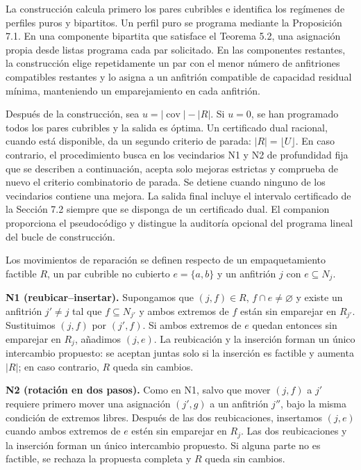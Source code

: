\documentclass[spanish,11pt,a4paper]{article}
\begin{document}
La construcción calcula primero los pares cubribles e identifica los
regímenes de perfiles puros y bipartitos. Un perfil puro se programa
mediante la Proposición 7.1. En una componente bipartita que satisface
el Teorema 5.2, una asignación propia desde listas programa cada par
solicitado. En las componentes restantes, la construcción elige
repetidamente un par con el menor número de anfitriones compatibles
restantes y lo asigna a un anfitrión compatible de capacidad residual
mínima, manteniendo un emparejamiento en cada anfitrión.

Después de la construcción, sea \(u=|\operatorname{cov}|-|R|\). Si
\(u=0\), se han programado todos los pares cubribles y la salida es
óptima. Un certificado dual racional, cuando está disponible, da un
segundo criterio de parada: \(|R|=\lfloor U\rfloor\). En caso contrario,
el procedimiento busca en los vecindarios N1 y N2 de profundidad fija
que se describen a continuación, acepta solo mejoras estrictas y
comprueba de nuevo el criterio combinatorio de parada. Se detiene cuando
ninguno de los vecindarios contiene una mejora. La salida final incluye
el intervalo certificado de la Sección 7.2 siempre que se disponga de un
certificado dual. El companion proporciona el pseudocódigo y distingue
la auditoría opcional del programa lineal del bucle de construcción.

Los movimientos de reparación se definen respecto de un empaquetamiento
factible \(R\), un par cubrible no cubierto \(e=\{a,b\}\) y un anfitrión
\(j\) con \(e\subseteq N_j\).

\textbf{N1 (reubicar--insertar).} Supongamos que \((j,f)\in R\),
\(f\cap e\ne\varnothing\) y existe un anfitrión \(j'\ne j\) tal que
\(f\subseteq N_{j'}\) y ambos extremos de \(f\) están sin emparejar en
\(R_{j'}\). Sustituimos \((j,f)\) por \((j',f)\). Si ambos extremos de
\(e\) quedan entonces sin emparejar en \(R_j\), añadimos \((j,e)\). La
reubicación y la inserción forman un único intercambio propuesto: se
aceptan juntas solo si la inserción es factible y aumenta \(|R|\); en
caso contrario, \(R\) queda sin cambios.

\textbf{N2 (rotación en dos pasos).} Como en N1, salvo que mover
\((j,f)\) a \(j'\) requiere primero mover una asignación \((j',g)\) a un
anfitrión \(j''\), bajo la misma condición de extremos libres. Después
de las dos reubicaciones, insertamos \((j,e)\) cuando ambos extremos de
\(e\) estén sin emparejar en \(R_j\). Las dos reubicaciones y la
inserción forman un único intercambio propuesto. Si alguna parte no es
factible, se rechaza la propuesta completa y \(R\) queda sin cambios.
\end{document}

